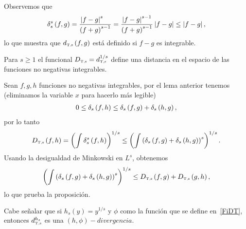 Observemos que
\begin{align}
\label{AcotacionDTporL1}
\delta_{s}^{s}\left( f,g \right) = \frac{\left| f - g \right|^{s}\ \ \ }{\left( f + g \right)^{s-1}} 
= \frac{\left| f - g \right|^{s-1}}{\left( f + g \right)^{s-1}}\left| f - g \right| \le \left| f - g \right|,
\end{align}
lo que muestra que $d_{\text{\tiny{T},s}}\left( f,g \right)$ está definido si $f-g$ es integrable.
\begin{proposition}
	\label{DTdistancia}
	Para $s \ge 1$ el funcional $D_{\text{\tiny{T},s}}=d_{\text{\tiny{T},s}}^{1/s}$ define una distancia en el espacio de las funciones no negativas integrables.
\end{proposition}
\begin{dem}
	Sean $f,g,h$ funciones no negativas integrables, por el lema anterior tenemos (eliminamos la variable $x$
	para hacerlo más legible)
	\begin{align*}
	0 \le \delta_{s}\left( f,h \right) \le \delta_{s}\left( f,g \right) + \delta_{s}\left( h,g \right),
	\end{align*}
	por lo tanto
	\begin{align*}
	D_{\text{\tiny{T},s}}\left( f,h \right) = \left( \int \delta_{s}^{s}\left( f,h \right) \right)^{1/s} \le 
	\left( \int \left( \delta_{s}\left( f,g \right) + \delta_{s}\left( h,g \right) \right)^{s} \right)^{1/s}.
	\end{align*}
	Usando la desigualdad de Minkowski en $L^{s}$, obtenemos
	\begin{align*}
	\left( \int \left( \delta_{s}\left( f,g \right) + \delta_{s}\left( h,g \right) \right)^{s} \right)^{1/s} \le 
	D_{\text{\tiny{T},s}}\left( f,g \right) + D_{\text{\tiny{T},s}}\left( g,h \right),
	\end{align*}
	lo que prueba la proposición.
\end{dem}

\begin{remark}
	Cabe señalar que si $h_s(y)=y^{1/s}$ y $\phi$ como la función que se define en~\ref{FiDT}, entonces $d_{\text{\tiny{T},s}}^{h_s}$ es una $(h,\phi) - divergencia$.
\end{remark}


